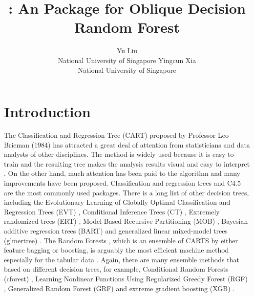 \documentclass[nojss]{jss}
\author{Yu Liu\\National University of Singapore
   \And Yingcun Xia\\National University of Singapore}
\title{\pkg{ODRF}: An \proglang{R} Package for Oblique Decision Random Forest}
\numberwithin{equation}{section}
\begin{document}




\section{Introduction} \label{sec:intro}

The Classification and Regression Tree (CART) proposed by Professor Leo Brieman (1984) has attracted a great deal of attention from statisticians and data analysts of other disciplines. The method is widely used because it is easy to train and the resulting tree makes the analysis results visual and easy to interpret \citep{2014Learning}. On the other hand, much attention has been paid to the algorithm and many improvements have been proposed. Classification and regression trees  \cite[]{quinlan1987decision} and \textsf{C4.5} \cite{quinlan1993program} are the most commonly used packages. There is a long list of other decision trees, including the Evolutionary Learning of Globally Optimal Classification and Regression Trees (\textsf{EVT}) \cite{Grubinger2014ectree},  Conditional Inference Trees (\textsf{CT}) \cite{hothorn2006unbiased}, Extremely randomized trees (\textsf{ERT}) \cite{2006Extremely}, Model-Based Recursive Partitioning (\textsf{MOB}) \cite{zeileis2015parties}, Bayesian additive regression trees (\textsf{BART}) \cite{maia2022gp} and generalized linear mixed-model trees (\textsf{glmertree}) \cite{2020Generalized}.  The Random Forests \citep[RF]{breiman2001random}, which is an ensemble of CARTS by either feature bagging or boosting,   is arguably the most efficient machine method especially for the tabular data \cite{tabularDATA}. Again, there are many ensemble methods that based on different decision trees, for example, Conditional Random Forests (\textsf{cforest}) \cite{hothorn2006unbiased}, Learning Nonlinear Functions Using Regularized Greedy Forest (\textsf{RGF}) \cite{2014Learning}, Generalized Random Forest (\textsf{GRF}) \cite{athey2019generalized} and extreme gradient boosting (\textsf{XGB}) \cite{chen2016xgboost}.
\end{document}
